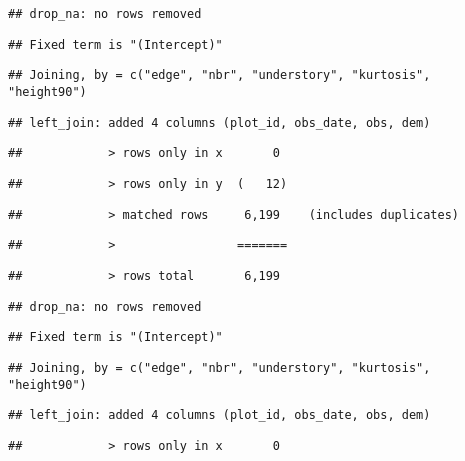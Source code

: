 \documentclass[
]{article}
\begin{document}
\begin{verbatim}
## drop_na: no rows removed
\end{verbatim}

\begin{verbatim}
## Fixed term is "(Intercept)"
\end{verbatim}

\begin{verbatim}
## Joining, by = c("edge", "nbr", "understory", "kurtosis", "height90")
\end{verbatim}

\begin{verbatim}
## left_join: added 4 columns (plot_id, obs_date, obs, dem)
\end{verbatim}

\begin{verbatim}
##            > rows only in x       0
\end{verbatim}

\begin{verbatim}
##            > rows only in y  (   12)
\end{verbatim}

\begin{verbatim}
##            > matched rows     6,199    (includes duplicates)
\end{verbatim}

\begin{verbatim}
##            >                 =======
\end{verbatim}

\begin{verbatim}
##            > rows total       6,199
\end{verbatim}

\begin{verbatim}
## drop_na: no rows removed
\end{verbatim}

\begin{verbatim}
## Fixed term is "(Intercept)"
\end{verbatim}

\begin{verbatim}
## Joining, by = c("edge", "nbr", "understory", "kurtosis", "height90")
\end{verbatim}

\begin{verbatim}
## left_join: added 4 columns (plot_id, obs_date, obs, dem)
\end{verbatim}

\begin{verbatim}
##            > rows only in x       0
\end{verbatim}
\end{document}
